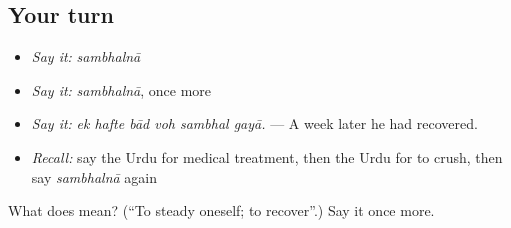\subsection*{Your turn}
\begin{itemize}
\raggedright
  \item \emph{Say it:} \emph{sambhalnā}
  \item \emph{Say it:} \emph{sambhalnā}, once more
  \item \emph{Say it:} \emph{ek hafte bād voh sambhal gayā.} — A week later he had recovered.
  \item \emph{Recall:} say the Urdu for medical treatment, then the Urdu for to crush, then say \emph{sambhalnā} again
\end{itemize}

\begin{tcolorbox}[breakable,colback=teal!4,colframe=teal!35!black,title={Before you move on}]
What does  mean? (\textquotedblleft{}To steady oneself; to recover\textquotedblright{}.) Say it once more.
\end{tcolorbox}
